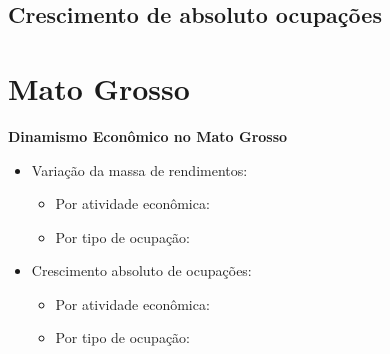 \documentclass[8pt]{beamer}
\begin{document}
\begin{frame}
\textit{\hyperlink{indice_principal_amz_ap}{}}

\end{frame}

\begin{frame}
\textit{\hyperlink{indice_principal_amz_ap}{}}

\end{frame}

\subsection{Crescimento de absoluto ocupações}

\begin{frame}
\textit{\hyperlink{indice_principal_amz_ap}{}}

\end{frame}

\begin{frame}
\textit{\hyperlink{indice_principal_amz_ap}{}}

\end{frame}

\section{Mato Grosso}

\begin{frame}[label=indice_principal_amz_mt]{}

\textit{\hyperlink{indice_principal}{}}

\textbf{Dinamismo Econômico no Mato Grosso}
\vspace{2mm}

\begin{itemize}

\item{Variação da massa de rendimentos:
	\begin{itemize}
	\item{Por atividade econômica: \hyperlink{amzmtrkngvmassaporcnae2dig}{}}
	\item{Por tipo de ocupação: \hyperlink{amzmtrkngvmassaporcod2dig}{}}
	\end{itemize}
}
\vspace{1mm}

\item{Crescimento  absoluto de ocupações:
	\begin{itemize}
	\item{Por atividade econômica: \hyperlink{amzmtrkngnocuporcnae2dig}{}}
	\item{Por tipo de ocupação: \hyperlink{amzmtrkngnocuporcod2dig}{}}
	\end{itemize}
}
\vspace{1mm}

\end{itemize}

\end{frame}
\end{document}
